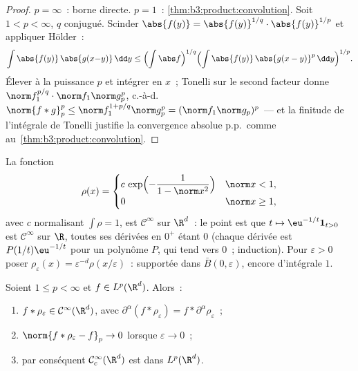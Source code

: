 \begin{proof}
$p = \infty$~: borne directe. $p = 1$~:
\cref{thm:b3:product:convolution}. Soit $1 < p < \infty$, $q$
conjugué. Scinder $\abs{f(y)} = \abs{f(y)}^{1/q}\cdot
\abs{f(y)}^{1/p}$ et appliquer Hölder~:
\[
\int\abs{f(y)}\,\abs{g(x{-}y)}\,\dd y
\leq \Bigl(\int\abs f\Bigr)^{1/q}
\Bigl(\int\abs{f(y)}\,\abs{g(x - y)}^p\,\dd y\Bigr)^{1/p} .
\]
Élever à la puissance $p$ et intégrer en $x$~; Tonelli sur le
second facteur donne $\norm f_1^{p/q}\cdot\norm f_1\norm
g_p^p$, c.-à-d.\ $\norm{f*g}_p^p \leq \norm f_1^{1 +
p/q}\norm g_p^p = (\norm f_1\norm g_p)^p$ --- et la finitude
de l'intégrale de Tonelli justifie la convergence absolue
p.p.\ comme au~\cref{thm:b3:product:convolution}.
\end{proof}

\begin{definition}[Mollificateurs]\label{def:b3:lp:mollifier}
La fonction
\[
\rho(x) = \begin{cases}
c\,\exp\Bigl(-\dfrac{1}{1 - \norm x^2}\Bigr) & \norm x < 1,\\
0 & \norm x \geq 1,
\end{cases}
\]
avec $c$ normalisant $\int\rho = 1$, est $\mathcal C^\infty$
sur $\R^d$~: le point est que $t \mapsto \eu^{-1/t}\mathbf
1_{t>0}$ est $\mathcal C^\infty$ sur $\R$, toutes ses
dérivées en $0^+$ étant $0$ (chaque dérivée est
$P(1/t)\eu^{-1/t}$ pour un polynôme $P$, qui tend vers $0$~;
induction). Pour $\varepsilon > 0$ poser
$\rho_\varepsilon(x) = \varepsilon^{-d}\rho(x/\varepsilon)$~:
supportée dans $\bar B(0, \varepsilon)$, encore d'intégrale
$1$.
\end{definition}

\begin{theorem}[Régularisation]\label{thm:b3:lp:regularization}
Soient $1 \leq p < \infty$ et $f \in L^p(\R^d)$. Alors~:
\begin{enumerate}
  \item $f * \rho_\varepsilon \in \mathcal C^\infty(\R^d)$,
        avec $\partial^\alpha(f * \rho_\varepsilon) = f *
        \partial^\alpha\rho_\varepsilon$~;
  \item $\norm{f * \rho_\varepsilon - f}_p \to 0$ lorsque
        $\varepsilon \to 0$~;
  \item par conséquent $\mathcal C^\infty_c(\R^d)$ est 
        dans $L^p(\R^d)$.
\end{enumerate}
\end{theorem}

